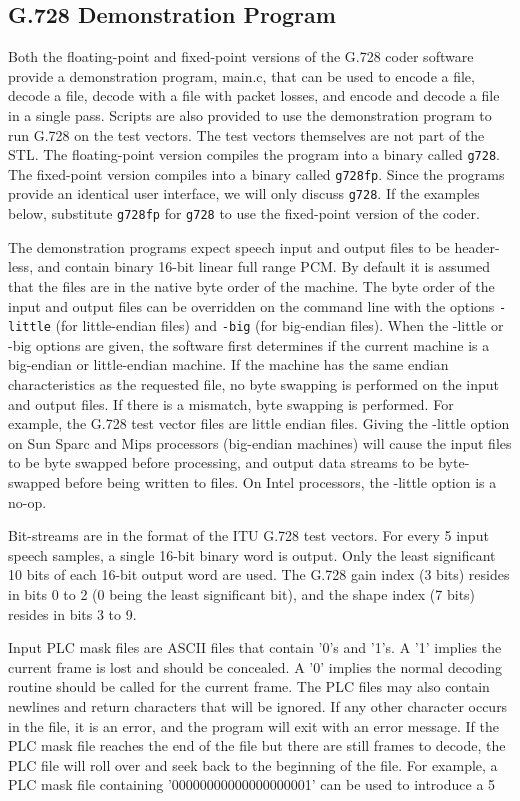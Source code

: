 \subsection {G.728 Demonstration Program}

Both the floating-point and fixed-point versions of the G.728 coder software
provide a demonstration program, main.c, that can be used to encode a
file, decode a file, decode with a file with packet losses, and
encode and decode a file in a single pass. Scripts are also
provided to use the demonstration program to run G.728 on the test vectors.
The test vectors themselves are not part of the STL.
The floating-point version compiles the program into a binary called {\tt g728}.
The fixed-point version compiles into a binary called {\tt g728fp}.
Since the programs provide an identical user
interface, we will only discuss {\tt g728}. If the examples below, substitute
{\tt g728fp} for {\tt g728} to use the fixed-point version of the coder.

The demonstration programs expect speech input and output files to be
header-less, and contain binary 16-bit linear full range PCM.
By default it is assumed that the files are in the native byte
order of the machine. The byte order of the
input and output files can be overridden on the command line with the
options {\tt -little} (for little-endian files) and {\tt -big}
(for big-endian files).
When the -little or -big options are given, the software first determines
if the current machine is a big-endian or little-endian machine.
If the machine has the same endian characteristics as the requested file,
no byte swapping is performed on the input and output files. If there is
a mismatch, byte swapping is performed. For example, the G.728 test vector
files are little endian files. Giving the -little option on Sun Sparc and
Mips processors (big-endian machines) will cause the input files to be byte
swapped before processing, and output data streams to be byte-swapped before
being written to files. On Intel processors, the -little option is a no-op.

Bit-streams are in the format of the ITU G.728 test vectors. For every 5 input
speech samples, a single 16-bit binary word is output. Only the least
significant 10 bits of each 16-bit output word are used.
The G.728 gain index (3 bits) resides in bits 0 to 2 (0 being the least
significant bit), and the shape index (7 bits) resides in bits 3 to 9.

Input PLC mask files are ASCII files that contain '0's and '1's.
A '1' implies the current frame is lost and should be concealed.
A '0' implies the normal decoding routine should be called for the current
frame. The PLC files may also contain newlines and return
characters that will be ignored. If any other character occurs in the file,
it is an error, and the program will exit with an error message.
If the PLC mask file reaches the end of the file
but there are still frames to decode, the PLC file will roll over and
seek back to the beginning of the file. For example, a PLC mask file containing
'00000000000000000001' can be used to introduce a 5%


